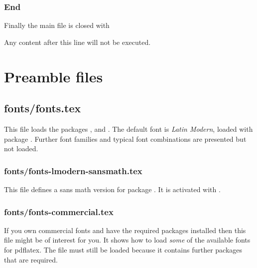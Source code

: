 \subsection{End}
\label{sec:document:end}

Finally the main file is closed with 

Any content after this line will not be executed.

\chapter{Preamble files}

\section{fonts/fonts.tex}

This file loads the packages ,  and
. The default font is \emph{Latin Modern}, loaded with package . Further font families and typical font combinations 
are presented but not loaded.


\subsection{fonts/fonts-lmodern-sansmath.tex}

This file defines a sans math version for package . 
It is activated with .


\subsection{fonts/fonts-commercial.tex}
If you own commercial fonts and have the required \latex packages installed then this file might be of interest for you. It shows how to load \emph{some} of the available fonts for pdflatex. The file  must still be loaded because it contains further packages that are required.

